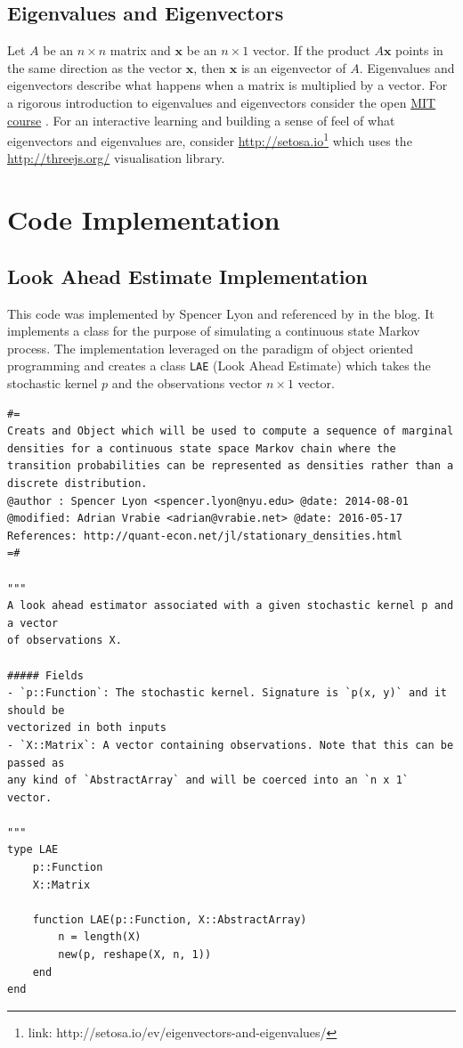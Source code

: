 \documentclass[a4paper,12pt]{article}
\theoremstyle{definition}
\begin{document}
\subsection{Eigenvalues and Eigenvectors}
Let $A$ be an $n\times n$ matrix and $\mathbf{x}$ be an $n\times 1$ vector. If the product $A\mathbf{x}$ points in the same direction as the vector $\mathbf{x}$, then $\mathbf{x}$ is an eigenvector of $A$. Eigenvalues and eigenvectors describe what happens when a matrix is multiplied by a vector. For a rigorous introduction to eigenvalues and eigenvectors consider the open \href{http://ocw.mit.edu/courses/mathematics/18-06sc-linear-algebra-fall-2011/least-squares-determinants-and-eigenvalues/eigenvalues-and-eigenvectors/}{MIT course} \cite{MITLA}. 
For an interactive learning and building a sense of feel of what eigenvectors and eigenvalues are, consider \href{http://setosa.io/ev/eigenvectors-and-eigenvalues/}{http://setosa.io}\footnote{link: http://setosa.io/ev/eigenvectors-and-eigenvalues/} which uses the \href{http://threejs.org/}{http://threejs.org/} visualisation library. 

\section{Code Implementation}
\subsection{Look Ahead Estimate Implementation}
This code was implemented by  Spencer Lyon and referenced by \citep{Stachurski2008} in the \cite{quantecon} blog. It implements a class for the purpose of simulating a continuous state Markov process. The implementation leveraged on the paradigm of object oriented programming and creates a class \texttt{LAE} (Look Ahead Estimate) which takes the stochastic kernel $p$ and the observations vector $n \times 1$ vector.

\begin{lstlisting}
#=
Creats and Object which will be used to compute a sequence of marginal densities for a continuous state space Markov chain where the transition probabilities can be represented as densities rather than a discrete distribution. 
@author : Spencer Lyon <spencer.lyon@nyu.edu> @date: 2014-08-01
@modified: Adrian Vrabie <adrian@vrabie.net> @date: 2016-05-17
References: http://quant-econ.net/jl/stationary_densities.html
=#

"""
A look ahead estimator associated with a given stochastic kernel p and a vector
of observations X.

##### Fields
- `p::Function`: The stochastic kernel. Signature is `p(x, y)` and it should be
vectorized in both inputs
- `X::Matrix`: A vector containing observations. Note that this can be passed as
any kind of `AbstractArray` and will be coerced into an `n x 1` vector.

"""
type LAE
    p::Function
    X::Matrix

    function LAE(p::Function, X::AbstractArray)
        n = length(X)
        new(p, reshape(X, n, 1))
    end
end
\end{lstlisting}
\end{document}

